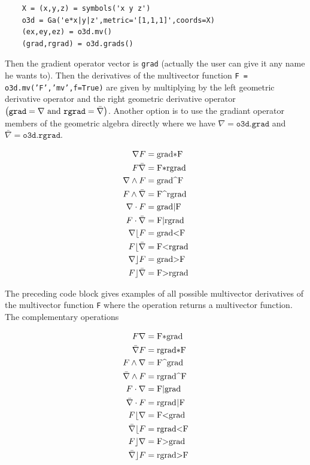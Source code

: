 \documentclass[12pt]{report}
\newcommand{\lp}{\left (}
\newcommand{\rp}{\right )}
\newcommand{\W}{\wedge}
\newcommand{\paren}[1]{\lp {#1} \rp}
\newcommand{\T}[1]{\texttt{#1}}
\begin{document}
\begin{lstlisting}
    X = (x,y,z) = symbols('x y z')
    o3d = Ga('e*x|y|z',metric='[1,1,1]',coords=X)
    (ex,ey,ez) = o3d.mv()
    (grad,rgrad) = o3d.grads()
\end{lstlisting}

Then the gradient operator vector is \T{grad} (actually the user can give
it any name he wants to).  Then the derivatives of the multivector
function \T{F = o3d.mv('F','mv',f=True)} are given by multiplying by the
left geometric derivative operator and the right geometric derivative operator
$\paren{\mbox{\T{grad}} = \nabla\mbox{ and } \mbox{\T{rgrad}} = \bar{\nabla}}$.  Another option 
is to use the gradiant operator members of the geometric algebra directly where we have
$\nabla = \T{o3d.grad}$ and $\bar{\nabla} = \T{o3d.rgrad}$.

      \begin{align}
            \nabla F &=  \mbox{\lstinline!grad*F!} \\
            F \bar{\nabla} &=  \mbox{\lstinline!F*rgrad!} \\
            \nabla \W F &=  \mbox{\lstinline!grad^F!} \\
            F \W \bar{\nabla} &=  \mbox{\lstinline!F^rgrad!} \\
            \nabla \cdot F &=  \mbox{\lstinline!grad|F!} \\
            F \cdot \bar{\nabla} &=  \mbox{\lstinline!F|rgrad!} \\
            \nabla \lfloor F &=  \mbox{\lstinline!grad<F!} \\
            F \lfloor \bar{\nabla} &=  \mbox{\lstinline!F<rgrad!} \\
            \nabla \rfloor F &=  \mbox{\lstinline!grad>F!} \\
            F \rfloor \bar{\nabla} &= \mbox{\lstinline!F>rgrad!}
      \end{align}

The preceding code block gives examples of all possible multivector
derivatives of the multivector function \T{F} where the operation returns
a multivector function. The complementary operations

      \begin{align}
            F \nabla &=  \mbox{\lstinline!F*grad!} \\
            \bar{\nabla} F &=  \mbox{\lstinline!rgrad*F!} \\
            F \W \nabla &=  \mbox{\lstinline!F^grad!} \\
            \bar{\nabla} \W F &=  \mbox{\lstinline!rgrad^F!} \\
            F \cdot \nabla &=  \mbox{\lstinline!F|grad!} \\
            \bar{\nabla}\cdot F &=  \mbox{\lstinline!rgrad|F!} \\
            F \lfloor \nabla &=  \mbox{\lstinline!F<grad!} \\
            \bar{\nabla} \lfloor F &=  \mbox{\lstinline!rgrad<F!} \\
            F \rfloor \nabla &=  \mbox{\lstinline!F>grad!} \\
            \bar{\nabla} \rfloor F &= \mbox{\lstinline!rgrad>F!}
      \end{align}
\end{document}
